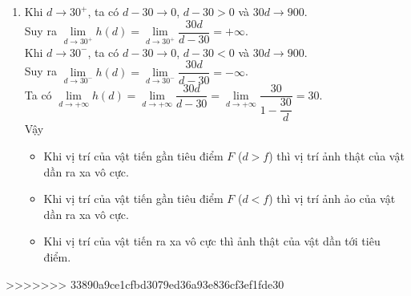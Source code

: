 \begin{bt}
{\begin{enumerate}
Vậy $d'=h(d) = \dfrac{30d}{d-30}$.
\item 
Khi $d\to 30^+$, ta có $d-30 \to 0$, $d-30 >0$ và $30d \to 900$.\\
Suy ra $\lim\limits _{d \rightarrow 30^{+}} h(d) = \lim\limits _{d \rightarrow 30^{+}} \dfrac{30d}{d-30} = +\infty$. \\
Khi $d\to 30^-$, ta có $d-30 \to 0$, $d-30 <0$ và $30d \to 900$.\\
Suy ra $\lim\limits _{d \rightarrow 30^{-}} h(d) = \lim\limits _{d \rightarrow 30^{-}} \dfrac{30d}{d-30} = -\infty$. \\
Ta có $\lim\limits _{d \rightarrow +\infty} h(d) =  \lim\limits _{d \rightarrow +\infty} \dfrac{30d}{d-30} = \lim\limits _{d \rightarrow +\infty}  \dfrac{30}{1-\dfrac{30}{d}} =30$. \\
Vậy 
\begin{itemize}
\item  Khi vị trí của vật tiến gần  tiêu điểm $F$ ($d >f$) thì vị trí ảnh thật của vật dần ra xa vô cực. 
\item  Khi vị trí của vật tiến gần  tiêu điểm $F$ ($d <f$) thì vị trí ảnh ảo của vật dần ra xa vô cực. 
\item  Khi vị trí của vật tiến ra xa vô cực thì  ảnh thật của vật dần tới tiêu điểm. 
\end{itemize}
\end{enumerate}
}
\end{bt}


>>>>>>> 33890a9ce1cfbd3079ed36a93e836cf3ef1fde30
